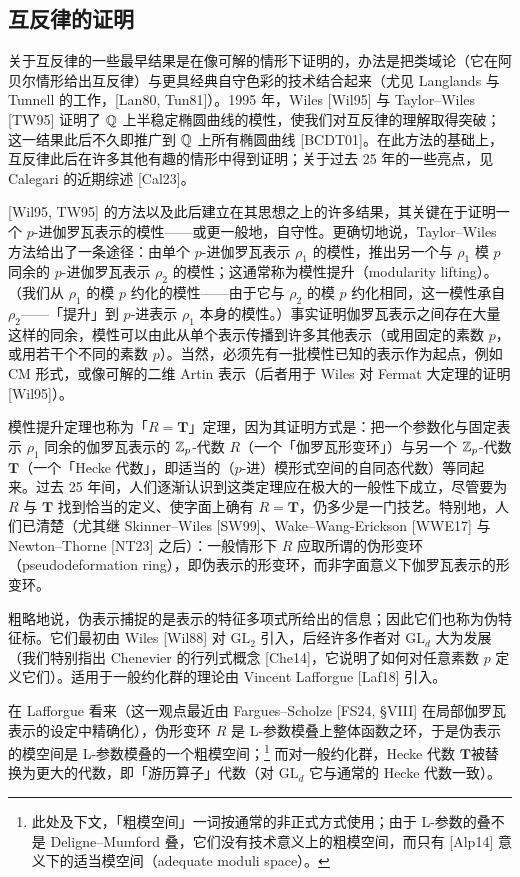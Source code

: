 \subsection{互反律的证明}

关于互反律的一些最早结果是在像可解的情形下证明的，办法是把类域论（它在阿贝尔情形给出互反律）与更具经典自守色彩的技术结合起来（尤见 Langlands 与 Tunnell 的工作，[Lan80, Tun81]）。1995 年，Wiles [Wil95] 与 Taylor--Wiles [TW95] 证明了 $\mathbb{Q}$ 上半稳定椭圆曲线的模性，使我们对互反律的理解取得突破；这一结果此后不久即推广到 $\mathbb{Q}$ 上所有椭圆曲线 [BCDT01]。在此方法的基础上，互反律此后在许多其他有趣的情形中得到证明；关于过去 25 年的一些亮点，见 Calegari 的近期综述 [Cal23]。

[Wil95, TW95] 的方法以及此后建立在其思想之上的许多结果，其关键在于证明一个 $p$-进伽罗瓦表示的模性——或更一般地，自守性。更确切地说，Taylor--Wiles 方法给出了一条途径：由单个 $p$-进伽罗瓦表示 $\rho_1$ 的模性，推出另一个与 $\rho_1$ 模 $p$ 同余的 $p$-进伽罗瓦表示 $\rho_2$ 的模性；这通常称为模性提升（modularity lifting）。（我们从 $\rho_1$ 的模 $p$ 约化的模性——由于它与 $\rho_2$ 的模 $p$ 约化相同，这一模性承自 $\rho_2$——「提升」到 $p$-进表示 $\rho_1$ 本身的模性。）事实证明伽罗瓦表示之间存在大量这样的同余，模性可以由此从单个表示传播到许多其他表示（或用固定的素数 $p$，或用若干个不同的素数 $p$）。当然，必须先有一批模性已知的表示作为起点，例如 CM 形式，或像可解的二维 Artin 表示（后者用于 Wiles 对 Fermat 大定理的证明 [Wil95]）。

模性提升定理也称为「$R=\mathbf T$」定理，因为其证明方式是：把一个参数化与固定表示 $\rho_1$ 同余的伽罗瓦表示的 $\mathbb{Z}_p$-代数 $R$（一个「伽罗瓦形变环」）与另一个 $\mathbb{Z}_p$-代数 $\mathbf T$（一个「Hecke 代数」，即适当的（$p$-进）模形式空间的自同态代数）等同起来。过去 25 年间，人们逐渐认识到这类定理应在极大的一般性下成立，尽管要为 $R$ 与 $\mathbf T$ 找到恰当的定义、使字面上确有 $R=\mathbf T$，仍多少是一门技艺。特别地，人们已清楚（尤其继 Skinner--Wiles [SW99]、Wake--Wang-Erickson [WWE17] 与 Newton--Thorne [NT23] 之后）：一般情形下 $R$ 应取所谓的伪形变环（pseudodeformation ring），即伪表示的形变环，而非字面意义下伽罗瓦表示的形变环。

粗略地说，伪表示捕捉的是表示的特征多项式所给出的信息；因此它们也称为伪特征标。它们最初由 Wiles [Wil88] 对 $\mathrm{GL}_2$ 引入，后经许多作者对 $\mathrm{GL}_d$ 大为发展（我们特别指出 Chenevier 的行列式概念 [Che14]，它说明了如何对任意素数 $p$ 定义它们）。适用于一般约化群的理论由 Vincent Lafforgue [Laf18] 引入。

在 Lafforgue 看来（这一观点最近由 Fargues--Scholze [FS24, §VIII] 在局部伽罗瓦表示的设定中精确化），伪形变环 $R$ 是 L-参数模叠上整体函数之环，于是伪表示的模空间是 L-参数模叠的一个粗模空间；\footnote{此处及下文，「粗模空间」一词按通常的非正式方式使用；由于 L-参数的叠不是 Deligne--Mumford 叠，它们没有技术意义上的粗模空间，而只有 [Alp14] 意义下的适当模空间（adequate moduli space）。} 而对一般约化群，Hecke 代数 $\mathbf T$被替换为更大的代数，即「游历算子」代数（对 $\mathrm{GL}_d$ 它与通常的 Hecke 代数一致）。

